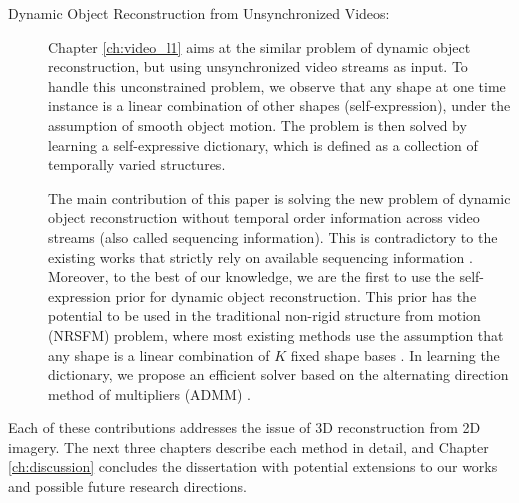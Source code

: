 \begin{description}
\item[Dynamic Object Reconstruction from Unsynchronized Videos:]
Chapter \ref{ch:video_l1} aims at the similar problem of dynamic object reconstruction, but using unsynchronized video streams as input. To handle this unconstrained problem, we observe that any shape at one time instance is a linear combination of other shapes (self-expression), under the assumption of smooth object motion. The problem is then solved by learning a self-expressive dictionary, which is defined as a collection of temporally varied structures. 

The main contribution of this paper is solving the new problem of dynamic object reconstruction without temporal order information across video streams (also called sequencing information). This is contradictory to the existing works that strictly rely on available sequencing information \cite{Park_ECCV2010,Valmadre_CVPR2012}. 
Moreover, to the best of our knowledge, we are the first to use the self-expression prior for dynamic object reconstruction. This prior has the potential to be used in the traditional non-rigid structure from motion (NRSFM) problem, where most existing methods use the assumption that any shape is a linear combination of $K$ fixed shape bases \cite{dai2014simple,Bregler_CVPR2000}. In learning the dictionary, we propose an efficient solver based on the alternating direction method of multipliers (ADMM) \cite{boyd2011distributed}.

\end{description}

Each of these contributions addresses the issue of 3D reconstruction from 2D imagery. The next three chapters describe each method in detail, and Chapter \ref{ch:discussion} concludes the dissertation with potential extensions to our works and possible future research directions. 

